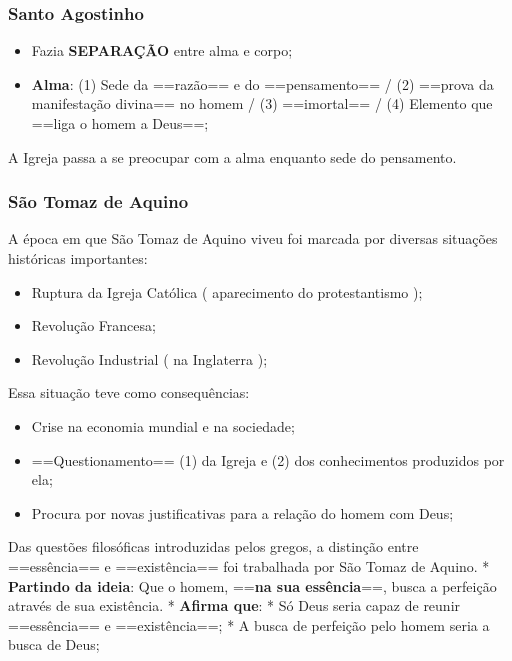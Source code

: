 \documentclass[
]{book}
\providecommand{\tightlist}{%
  \setlength{\itemsep}{0pt}\setlength{\parskip}{0pt}}
\theoremstyle{definition}
\theoremstyle{definition}
\theoremstyle{definition}
\theoremstyle{definition}
\theoremstyle{remark}
\begin{document}
\hypertarget{santo-agostinho}{%
\subsubsection*{Santo Agostinho}\label{santo-agostinho}}

\begin{itemize}
\tightlist
\item
  Fazia \textbf{SEPARAÇÃO} entre alma e corpo;
\item
  \textbf{Alma}: (1) Sede da ==razão== e do ==pensamento== / (2) ==prova da manifestação divina== no homem / (3) ==imortal== / (4) Elemento que ==liga o homem a Deus==;
\end{itemize}

A Igreja passa a se preocupar com a alma enquanto sede do pensamento.

\hypertarget{suxe3o-tomaz-de-aquino}{%
\subsubsection*{São Tomaz de Aquino}\label{suxe3o-tomaz-de-aquino}}

A época em que São Tomaz de Aquino viveu foi marcada por diversas situações históricas importantes:

\begin{itemize}
\tightlist
\item
  Ruptura da Igreja Católica ( aparecimento do protestantismo );
\item
  Revolução Francesa;
\item
  Revolução Industrial ( na Inglaterra );
\end{itemize}

Essa situação teve como consequências:

\begin{itemize}
\tightlist
\item
  Crise na economia mundial e na sociedade;
\item
  ==Questionamento== (1) da Igreja e (2) dos conhecimentos produzidos por ela;
\item
  Procura por novas justificativas para a relação do homem com Deus;
\end{itemize}

Das questões filosóficas introduzidas pelos gregos, a distinção entre ==essência== e ==existência== foi trabalhada por São Tomaz de Aquino.
* \textbf{Partindo da ideia}: Que o homem, ==\textbf{na sua essência}==, busca a perfeição através de sua existência.
* \textbf{Afirma que}:
* Só Deus seria capaz de reunir ==essência== e ==existência==;
* A busca de perfeição pelo homem seria a busca de Deus;
\end{document}
